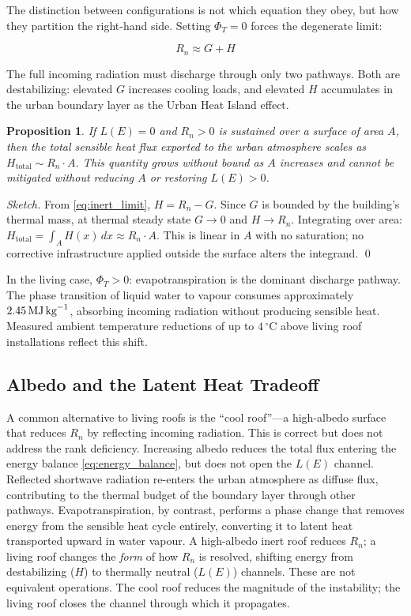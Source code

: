 \documentclass[12pt, a4paper]{article}
\theoremstyle{plain}
\newtheorem{proposition}{Proposition}
\theoremstyle{remark}
\begin{document}
The distinction between configurations is not which equation they obey, but how they partition the right-hand side. Setting $\Phi_T = 0$ forces the degenerate limit:

\begin{equation}
R_n \approx G + H
\label{eq:inert_limit}
\end{equation}

\noindent The full incoming radiation must discharge through only two pathways. Both are destabilizing: elevated $G$ increases cooling loads, and elevated $H$ accumulates in the urban boundary layer as the Urban Heat Island effect.

\begin{proposition}
\label{prop:thermal}
If\/ $L(E) = 0$ and $R_n > 0$ is sustained over a surface of area $A$, then the total sensible heat flux exported to the urban atmosphere scales as $H_{\mathrm{total}} \sim R_n \cdot A$. This quantity grows without bound as $A$ increases and cannot be mitigated without reducing $A$ or restoring $L(E) > 0$.
\end{proposition}

\begin{proof}[Sketch]
From \eqref{eq:inert_limit}, $H = R_n - G$. Since $G$ is bounded by the building's thermal mass, at thermal steady state $G \to 0$ and $H \to R_n$. Integrating over area: $H_{\mathrm{total}} = \int_A H(x)\,dx \approx R_n \cdot A$. This is linear in $A$ with no saturation; no corrective infrastructure applied outside the surface alters the integrand. \qed
\end{proof}

In the living case, $\Phi_T > 0$: evapotranspiration is the dominant discharge pathway. The phase transition of liquid water to vapour consumes approximately $2.45\,\text{MJ\,kg}^{-1}$, absorbing incoming radiation without producing sensible heat. Measured ambient temperature reductions of up to $4\,^\circ\text{C}$ above living roof installations reflect this shift.

\subsection{Albedo and the Latent Heat Tradeoff}

A common alternative to living roofs is the ``cool roof''---a high-albedo surface that reduces $R_n$ by reflecting incoming radiation. This is correct but does not address the rank deficiency. Increasing albedo reduces the total flux entering the energy balance \eqref{eq:energy_balance}, but does not open the $L(E)$ channel. Reflected shortwave radiation re-enters the urban atmosphere as diffuse flux, contributing to the thermal budget of the boundary layer through other pathways. Evapotranspiration, by contrast, performs a phase change that removes energy from the sensible heat cycle entirely, converting it to latent heat transported upward in water vapour. A high-albedo inert roof reduces $R_n$; a living roof changes the \emph{form} of how $R_n$ is resolved, shifting energy from destabilizing ($H$) to thermally neutral ($L(E)$) channels. These are not equivalent operations. The cool roof reduces the magnitude of the instability; the living roof closes the channel through which it propagates.
\end{document}
